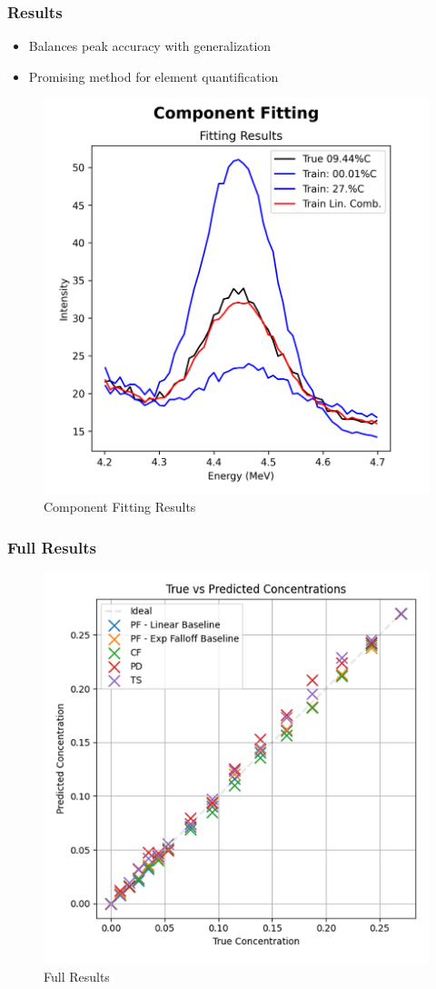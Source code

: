 \documentclass[xcolor=dvipsnames,envcountsect]{beamer}
\begin{document}
\begin{frame}
  \frametitle{Results}
  \begin{itemize}
    \item Balances peak accuracy with generalization
    \item Promising method for element quantification
  \end{itemize}
  \begin{figure}
      \centering
      \includegraphics[width=.5\linewidth]{Figures/componentfitting.png}
      \caption{Component Fitting Results}
      \label{fig:componentfitting}
  \end{figure}
\end{frame}

\begin{frame}
  \frametitle{Full Results}
  \begin{figure}
      \centering
      \includegraphics[width=.5\linewidth]{Figures/fullresults.png}
      \caption{Full Results}
      \label{fig:fullresults}
  \end{figure}
\end{frame}
\end{document}

